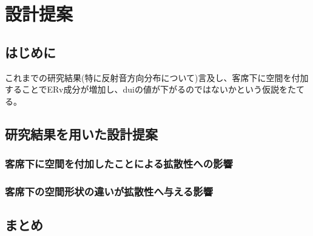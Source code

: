 \chapter{設計提案}
\section{はじめに}
これまでの研究結果(特に反射音方向分布について)言及し、客席下に空間を付加することでERv成分が増加し、duiの値が下がるのではないかという仮説をたてる。
\section{研究結果を用いた設計提案}
\subsection{客席下に空間を付加したことによる拡散性への影響}
\subsection{客席下の空間形状の違いが拡散性へ与える影響}
\section{まとめ}